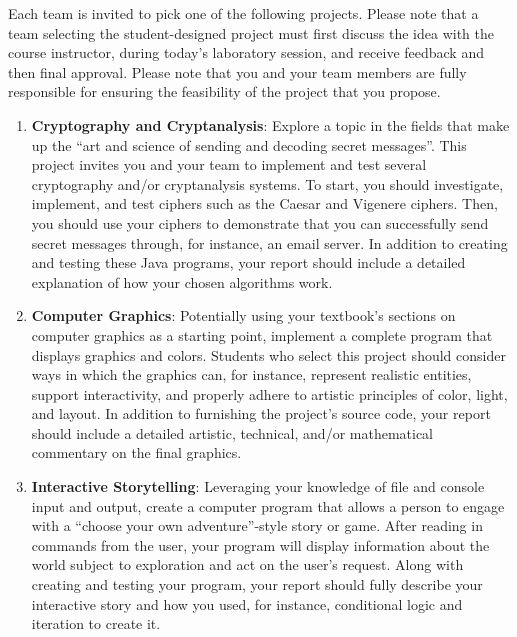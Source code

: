 \documentclass[11pt]{article}
\begin{document}
Each team is invited to pick one of the following projects.  Please note that a
team selecting the student-designed project must first discuss the idea with the
course instructor, during today's laboratory session, and receive feedback and
then final approval. Please note that you and your team members are fully
responsible for ensuring the feasibility of the project that you propose.

\begin{enumerate}

  \item {\bf Cryptography and Cryptanalysis}: Explore a topic in the fields that
    make up the ``art and science of sending and decoding secret messages''.
    This project invites you and your team to implement and test several
    cryptography and/or cryptanalysis systems. To start, you should investigate,
    implement, and test ciphers such as the Caesar and Vigenere ciphers. Then,
    you should use your ciphers to demonstrate that you can successfully send
    secret messages through, for instance, an email server. In addition to
    creating and testing these Java programs, your report should include a
    detailed explanation of how your chosen algorithms work.

  \item {\bf Computer Graphics}: Potentially using your textbook's sections on
    computer graphics as a starting point, implement a complete program that
    displays graphics and colors. Students who select this project should
    consider ways in which the graphics can, for instance, represent realistic
    entities, support interactivity, and properly adhere to artistic principles
    of color, light, and layout. In addition to furnishing the project's source
    code, your report should include a detailed artistic, technical, and/or
    mathematical commentary on the final graphics.

  \item {\bf Interactive Storytelling}: Leveraging your knowledge of file and
    console input and output, create a computer program that allows a person to
    engage with a ``choose your own adventure''-style story or game. After
    reading in commands from the user, your program will display information
    about the world subject to exploration and act on the user's request. Along
    with creating and testing your program, your report should fully describe
    your interactive story and how you used, for instance, conditional logic and
    iteration to create it.


\end{enumerate}
\end{document}
